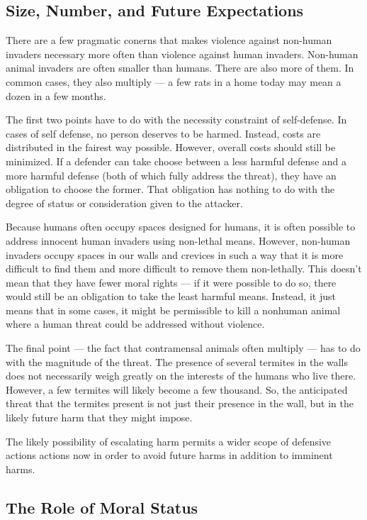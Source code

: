 \documentclass[12pt]{book}
\begin{document}
	\subsection{Size, Number, and Future Expectations}

	There are a few pragmatic conerns that makes violence against non-human
	invaders necessary more often than violence against human invaders.
	Non-human animal invaders are often smaller than humans. There are also more
	of them. In common cases, they also multiply --- a few rats in a home today
	may mean a dozen in a few months.

	The first two points have to do with the necessity constraint of
	self-defense.  In cases of self defense, no person deserves to be harmed.
	Instead, costs are distributed in the fairest way possible. However,
	overall costs should still be minimized. If a defender can take choose
	between a less harmful defense and a more harmful defense (both of which
	fully address the threat), they have an obligation to choose the former.
	That obligation has nothing to do with the degree of status or
	consideration given to the attacker.

	Because humans often occupy spaces designed for humans, it is often
	possible to address innocent human invaders using non-lethal means.
	However, non-human invaders occupy spaces in our walls and crevices in such
	a way that it is more difficult to find them and more difficult to remove
	them non-lethally. This doesn’t mean that they have fewer moral rights ---
	if it were possible to do so, there would still be an obligation to take
	the least harmful means. Instead, it just means that in some cases, it
	might be permissible to kill a nonhuman animal where a human threat could
	be addressed without violence.

	The final point --- the fact that contramensal animals often multiply ---
	has to do with the magnitude of the threat. The presence of several
	termites in the walls does not necessarily weigh greatly on the interests
	of the humans who live there. However, a few termites will likely become a
	few thousand. So, the anticipated threat that the termites present is not
	just their presence in the wall, but in the likely future harm that they
	might impose.

	The likely possibility of escalating harm permits a wider scope of
	defensive actions actions now in order to avoid future harms in addition to
	imminent harms.

	\subsection{The Role of Moral Status}
\end{document}
